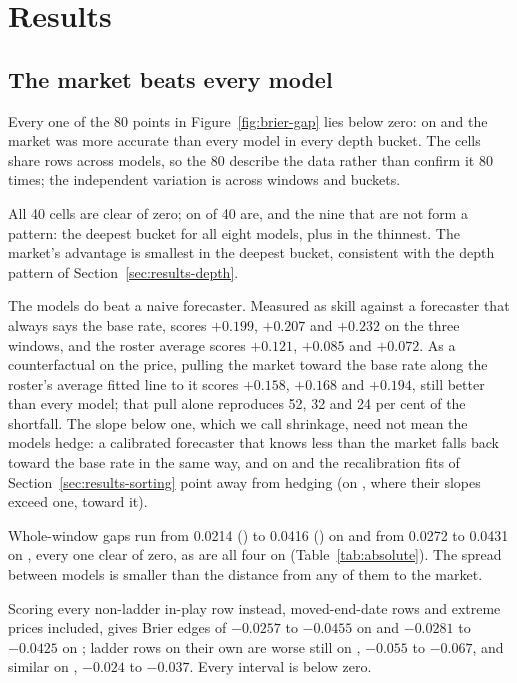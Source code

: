\section{Results}
\label{sec:results}

\subsection{The market beats every model}
\label{sec:results-market}

Every one of the 80 points in Figure~\ref{fig:brier-gap} lies below zero: on
\winB and \winC the market was more accurate than every model in every depth
bucket. The cells share rows across models, so the 80 describe the data rather
than confirm it 80 times; the independent variation is across windows and
buckets.

All 40 \winC cells are clear of zero; on  of 40 are, and the nine that
are not form a pattern: the deepest bucket for all eight models, plus
\mGptFiveFive in the thinnest. The market's advantage is smallest in the
deepest bucket, consistent with the depth pattern of
Section~\ref{sec:results-depth}.

The models do beat a naive forecaster. Measured as skill against a forecaster
that always says the base rate, \market scores $+0.199$, $+0.207$ and $+0.232$ on
the three windows, and the roster average scores $+0.121$, $+0.085$ and $+0.072$.
As a counterfactual on the price, pulling the market toward the base rate along the roster's
average fitted line to it scores $+0.158$, $+0.168$ and $+0.194$, still better
than every model; that pull alone reproduces 52, 32 and 24 per cent of the
shortfall. The slope below one, which we call shrinkage, need not mean the
models hedge: a calibrated forecaster that knows less than the market falls back
toward the base rate in the same way, and on \winB and \winC the recalibration
fits of Section~\ref{sec:results-sorting} point away from hedging (on \winA,
where their slopes exceed one, toward it).

Whole-window gaps run from 0.0214 (\mGptFiveFive) to 0.0416 (\mGptOss) on \winB
and from 0.0272 to 0.0431 on \winC, every one clear of zero, as are all four on
\winA (Table~\ref{tab:absolute}). The spread between models is smaller than the
distance from any of them to the market.

Scoring every non-ladder in-play row instead, moved-end-date rows and extreme
prices included, gives Brier edges of $-0.0257$ to $-0.0455$ on \winB and
$-0.0281$ to $-0.0425$ on \winC; ladder rows on their own are worse still on \winB,
$-0.055$ to $-0.067$, and similar on \winC, $-0.024$ to $-0.037$. Every interval
is below zero.

